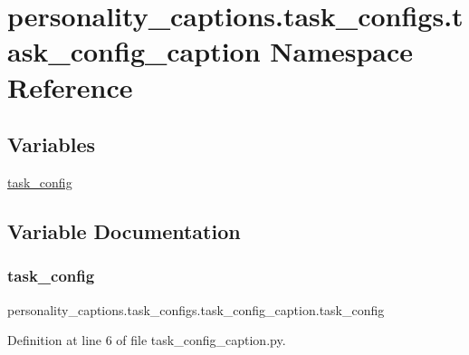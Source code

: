 \hypertarget{namespacepersonality__captions_1_1task__configs_1_1task__config__caption}{}\section{personality\+\_\+captions.\+task\+\_\+configs.\+task\+\_\+config\+\_\+caption Namespace Reference}
\label{namespacepersonality__captions_1_1task__configs_1_1task__config__caption}
\subsection*{Variables}
\begin{DoxyCompactItemize}
\item 
\hyperlink{namespacepersonality__captions_1_1task__configs_1_1task__config__caption_a2dafc15d5a88c07cd526aac6dcf698c9}{task\+\_\+config}
\end{DoxyCompactItemize}


\subsection{Variable Documentation}
\mbox{\label{namespacepersonality__captions_1_1task__configs_1_1task__config__caption_a2dafc15d5a88c07cd526aac6dcf698c9}} 
\subsubsection{\texorpdfstring{task\+\_\+config}{task\_config}}
{\footnotesize\ttfamily personality\+\_\+captions.\+task\+\_\+configs.\+task\+\_\+config\+\_\+caption.\+task\+\_\+config}



Definition at line 6 of file task\+\_\+config\+\_\+caption.\+py.

